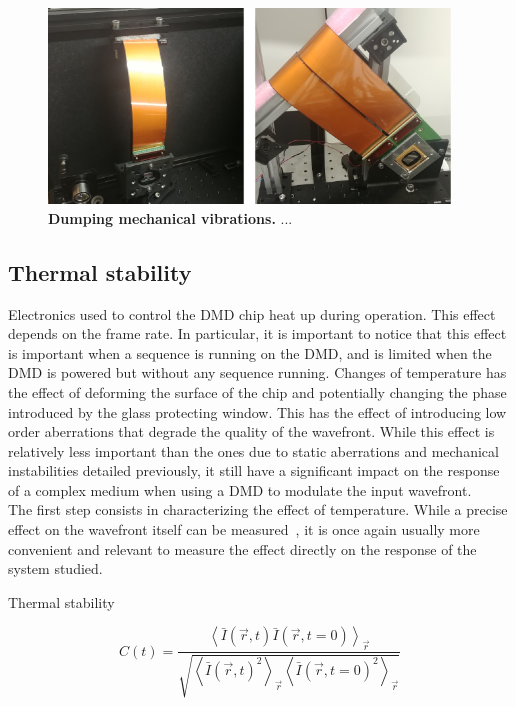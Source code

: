 \documentclass[12pt]{iopart}
\begin{document}
\begin{figure}
  \centering
  \includegraphics[width = 0.95\textwidth]{images/dumping.pdf}
  \caption{
  \textbf{Dumping mechanical vibrations.}
 ...
  }
  \label{fig:dumping}
\end{figure}

\subsection{Thermal stability}

Electronics used to control the DMD chip heat up during operation.
This effect depends on the frame rate. 
In particular, it is important to notice that this effect is important when 
a sequence is running on the DMD, and is limited when the DMD is powered 
but without any sequence running.
Changes of temperature has the effect of deforming the surface of the chip 
and potentially changing the phase introduced by the glass protecting window.
This has the effect of introducing low order aberrations that degrade the quality of the wavefront.
While this effect is relatively less important than the ones due to 
static aberrations and mechanical instabilities detailed previously, 
it still have a significant impact on the response of a complex medium 
when using a DMD to modulate the input wavefront.\\

The first step consists in characterizing the effect of temperature. 
While a precise effect on the wavefront itself can be measured~\cite{Rudolf2021thermal}, 
it is once again usually more convenient and relevant to measure the effect directly on the response of the system studied.



Thermal stability~\cite{Rudolf2021thermal}

\begin{equation}
C(t) = 
  \frac{
    \left\langle 
     \bar{I}(\vec{r}, t) \bar{I}(\vec{r}, t=0) 
     \right\rangle_{\vec{r}}
  }{
    \sqrt{
     \left\langle 
      \bar{I}(\vec{r}, t)^2 
     \right\rangle_{\vec{r}}
     \left\langle 
      \bar{I}(\vec{r}, t=0)^2 
     \right\rangle_{\vec{r}}
    }
  }
\end{equation}
\end{document}
